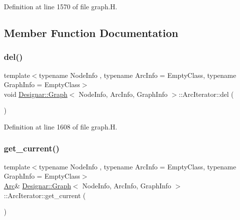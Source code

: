 Definition at line 1570 of file graph.\+H.



\subsection{Member Function Documentation}
\mbox{\label{class_designar_1_1_graph_1_1_arc_iterator_a6375bb0513856b2b20dffbfb2496082e}} 
\subsubsection{\texorpdfstring{del()}{del()}}
{\footnotesize\ttfamily template$<$typename Node\+Info , typename Arc\+Info  = Empty\+Class, typename Graph\+Info  = Empty\+Class$>$ \\
void \hyperlink{class_designar_1_1_graph}{Designar\+::\+Graph}$<$ Node\+Info, Arc\+Info, Graph\+Info $>$\+::Arc\+Iterator\+::del (\begin{DoxyParamCaption}{ }\end{DoxyParamCaption})\hspace{0.3cm}{\ttfamily [inline]}}



Definition at line 1608 of file graph.\+H.

\mbox{\label{class_designar_1_1_graph_1_1_arc_iterator_a4915ccaef38293e9dc449e7dba3965ec}} 
\subsubsection{\texorpdfstring{get\+\_\+current()}{get\_current()}\hspace{0.1cm}{\footnotesize\ttfamily [1/2]}}
{\footnotesize\ttfamily template$<$typename Node\+Info , typename Arc\+Info  = Empty\+Class, typename Graph\+Info  = Empty\+Class$>$ \\
\hyperlink{class_designar_1_1_graph_a74c730ef4ce2d20f998d72bd25c2b5bf}{Arc}\& \hyperlink{class_designar_1_1_graph}{Designar\+::\+Graph}$<$ Node\+Info, Arc\+Info, Graph\+Info $>$\+::Arc\+Iterator\+::get\+\_\+current (\begin{DoxyParamCaption}{ }\end{DoxyParamCaption})\hspace{0.3cm}{\ttfamily [inline]}}



